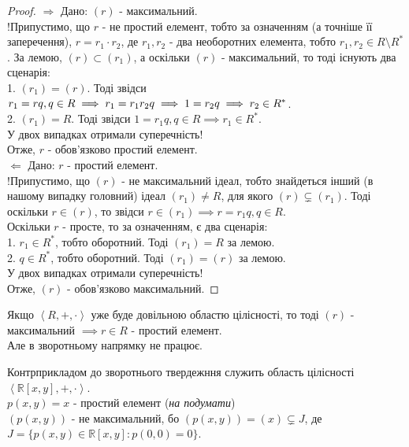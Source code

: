 \documentclass{math_library}
\begin{document}
\begin{proof}
$\boxed{\Rightarrow}$ Дано: $(r)$ - максимальний.\\
!Припустимо, що $r$ - не простий елемент, тобто за означенням (а точніше її заперечення), $r = r_1 \cdot r_2$, де $r_1,r_2$ - два необоротних елемента, тобто $r_1,r_2 \in R \setminus R^*$. За лемою, $(r) \subset (r_1)$, а оскільки $(r)$ - максимальний, то тоді існують два сценарія:\\
1. $(r_1) = (r)$. Тоді звідси $r_1 = rq, q \in R \implies r_1 = r_1r_2q \implies 1 = r_2q \\ \implies r_2 \in R^*$.\\
2. $(r_1) = R$. Тоді звідси $1 = r_1q, q \in R \implies r_1 \in R^*$.\\
У двох випадках отримали суперечність!\\
Отже, $r$ - обов'язково простий елемент.
\bigskip \\
$\boxed{\Leftarrow}$ Дано: $r$ - простий елемент.\\
!Припустимо, що $(r)$ - не максимальний ідеал, тобто знайдеться інший (в нашому випадку головний) ідеал $(r_1) \neq R$, для якого $(r) \subsetneq (r_1)$. Тоді оскільки $r \in (r)$, то звідси $r \in (r_1) \implies r = r_1q, q \in R$.\\
Оскільки $r$ - просте, то за означенням, є два сценарія:\\
1. $r_1 \in R^*$, тобто оборотний. Тоді $(r_1) = R$ за лемою.\\
2. $q \in R^*$, тобто оборотний. Тоді $(r_1) = (r)$ за лемою.\\
У двох випадках отримали суперечність!\\
Отже, $(r)$ - обов'язково максимальний.
\end{proof}

\begin{remark}
Якщо $\left<R,+,\cdot \right>$ уже буде довільною областю цілісності, то тоді
$(r)$ - максимальний $\implies r \in R$ - простий елемент.\\
Але в зворотньому напрямку не працює.
\end{remark}

\begin{example}
Контрприкладом до зворотнього твердежння служить область цілісності $\left< \mathbb{R}[x,y], +, \cdot \right>$.\\
$p(x,y) = x$ - простий елемент (\textit{на подумати})\\
$(p(x,y))$ - не максимальний, бо $(p(x,y)) = (x) \subsetneq J$, де \\ $J = \{p(x,y) \in \mathbb{R}[x,y]: p(0,0) =0\}$.
\end{example}
\end{document}
